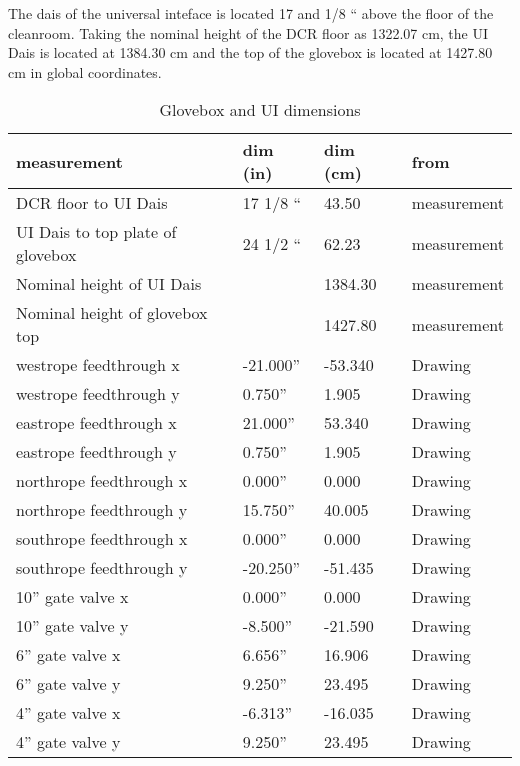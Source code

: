   The dais of the universal inteface is located 17 and 1/8 `` above
the floor of the cleanroom.  Taking the nominal height of the DCR floor
as 1322.07 cm, the UI Dais is located at 1384.30 cm and the top of the
glovebox is located at 1427.80 cm in global coordinates.
\begin{table}[htbp]
\begin{center}
\begin{tabular}{|l|l|l|l|}
\hline
measurement                      & dim (in)   & dim (cm) & from \\ \hline
DCR floor to UI Dais             & 17 1/8 ``  & 43.50    & measurement \\
UI Dais to top plate of glovebox & 24 1/2 ``  & 62.23    & measurement \\
Nominal height of UI Dais        &            & 1384.30  & measurement \\
Nominal height of glovebox top   &            & 1427.80  & measurement \\
\hline
westrope feedthrough  x          & -21.000''  & -53.340  & Drawing \\
westrope feedthrough  y          &   0.750''  &   1.905  & Drawing \\
\hline
eastrope feedthrough  x          &  21.000''  &  53.340  & Drawing \\
eastrope feedthrough  y          &   0.750''  &   1.905  & Drawing \\
\hline
northrope feedthrough  x         &   0.000''  &   0.000  & Drawing \\
northrope feedthrough  y         &  15.750''  &  40.005  & Drawing \\
\hline
southrope feedthrough  x         &   0.000''  &   0.000  & Drawing \\
southrope feedthrough  y         & -20.250''  & -51.435  & Drawing \\
\hline
10'' gate valve        x         &   0.000''  &   0.000  & Drawing \\
10'' gate valve        y         &  -8.500''  & -21.590  & Drawing \\
\hline
 6'' gate valve        x         &   6.656''  &  16.906 & Drawing \\
 6'' gate valve        y         &   9.250''  &  23.495 & Drawing \\
\hline
 4'' gate valve        x         &  -6.313''  & -16.035 & Drawing \\
 4'' gate valve        y         &   9.250''  &  23.495 & Drawing \\
\hline
\end{tabular}
\caption[Glovebox and UI dimensions]
        {Glovebox and UI dimensions
        }
\end{center}
\end{table}
  
